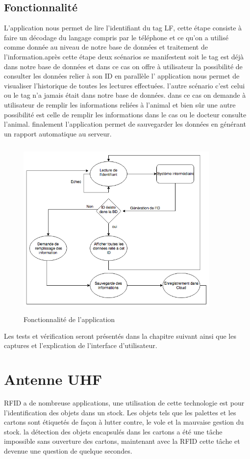 \documentclass[11pt, a4paper, twoside]{book}
\begin{document}
\subsection{Fonctionnalité}
L'application nous permet de lire l'identifiant du tag LF, cette étape consiste à faire un décodage du langage compris par le téléphone et ce qu'on a utilisé comme donnée au niveau de notre base de données et traitement de l'information.après cette étape deux scénarios se manifestent soit le tag est déjà dans notre base de données et dans ce cas on offre à utilisateur la possibilité de consulter les données relier à son ID en parallèle l' application nous permet de visualiser l'historique de toutes les lectures effectuées. l'autre scénario c'est celui ou le tag n'a jamais était dans notre base de données. dans ce cas on demande à utilisateur de remplir les informations reliées à l'animal et bien sûr une autre possibilité est celle de remplir les informations dans le cas ou le docteur consulte l'animal. finalement l'application permet de sauvegarder les données en générant un rapport automatique au serveur.

\begin{figure}[H]
\centering
\includegraphics[width=10cm,height=9cm]{fonc}
\caption{Fonctionnalité de l'application}
\end{figure}
Les tests et vérification seront présentés dans la chapitre suivant ainsi que les captures et l'explication de l'interface d'utilisateur.

\section{Antenne UHF}
RFID a de nombreuse applications, une utilisation de cette technologie est pour l'identification des objets dans un stock. Les objets tels que les palettes et les cartons sont étiquetés de façon à lutter contre, le vole et la mauvaise gestion du stock. la détection des objets encapsulés dans les cartons a été une tâche impossible sans ouverture des cartons, maintenant avec la RFID cette tâche et devenue une question de quelque secondes.
\end{document}
